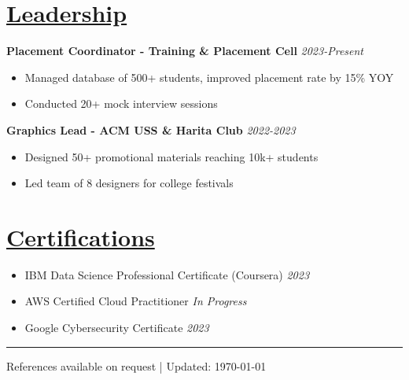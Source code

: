 \documentclass[a4paper,10pt]{article}
\begin{document}
\section*{\underline{Leadership}}
\textbf{Placement Coordinator - Training \& Placement Cell} \hfill \textit{2023-Present}\\
\begin{itemize}[leftmargin=*]
    \item Managed database of 500+ students, improved placement rate by 15\% YOY
    \item Conducted 20+ mock interview sessions
\end{itemize}

\textbf{Graphics Lead - ACM USS \& Harita Club} \hfill \textit{2022-2023}\\
\begin{itemize}[leftmargin=*]
    \item Designed 50+ promotional materials reaching 10k+ students
    \item Led team of 8 designers for college festivals
\end{itemize}

\section*{\underline{Certifications}}
\begin{itemize}[leftmargin=*]
    \item IBM Data Science Professional Certificate (Coursera) \hfill \textit{2023}
    \item AWS Certified Cloud Practitioner \hfill \textit{In Progress}
    \item Google Cybersecurity Certificate \hfill \textit{2023}
\end{itemize}

\hrule
\vspace{3mm}
\begin{center}
    {\small References available on request | Updated: \today}
\end{center}
\end{document}
